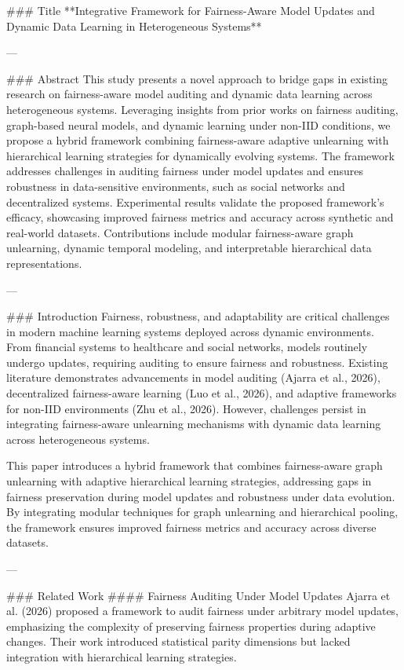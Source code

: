 ### Title  
**Integrative Framework for Fairness-Aware Model Updates and Dynamic Data Learning in Heterogeneous Systems**

---

### Abstract  
This study presents a novel approach to bridge gaps in existing research on fairness-aware model auditing and dynamic data learning across heterogeneous systems. Leveraging insights from prior works on fairness auditing, graph-based neural models, and dynamic learning under non-IID conditions, we propose a hybrid framework combining fairness-aware adaptive unlearning with hierarchical learning strategies for dynamically evolving systems. The framework addresses challenges in auditing fairness under model updates and ensures robustness in data-sensitive environments, such as social networks and decentralized systems. Experimental results validate the proposed framework's efficacy, showcasing improved fairness metrics and accuracy across synthetic and real-world datasets. Contributions include modular fairness-aware graph unlearning, dynamic temporal modeling, and interpretable hierarchical data representations.  

---

### Introduction  
Fairness, robustness, and adaptability are critical challenges in modern machine learning systems deployed across dynamic environments. From financial systems to healthcare and social networks, models routinely undergo updates, requiring auditing to ensure fairness and robustness. Existing literature demonstrates advancements in model auditing (Ajarra et al., 2026), decentralized fairness-aware learning (Luo et al., 2026), and adaptive frameworks for non-IID environments (Zhu et al., 2026). However, challenges persist in integrating fairness-aware unlearning mechanisms with dynamic data learning across heterogeneous systems.

This paper introduces a hybrid framework that combines fairness-aware graph unlearning with adaptive hierarchical learning strategies, addressing gaps in fairness preservation during model updates and robustness under data evolution. By integrating modular techniques for graph unlearning and hierarchical pooling, the framework ensures improved fairness metrics and accuracy across diverse datasets.

---

### Related Work  
#### Fairness Auditing Under Model Updates  
Ajarra et al. (2026) proposed a framework to audit fairness under arbitrary model updates, emphasizing the complexity of preserving fairness properties during adaptive changes. Their work introduced statistical parity dimensions but lacked integration with hierarchical learning strategies.

